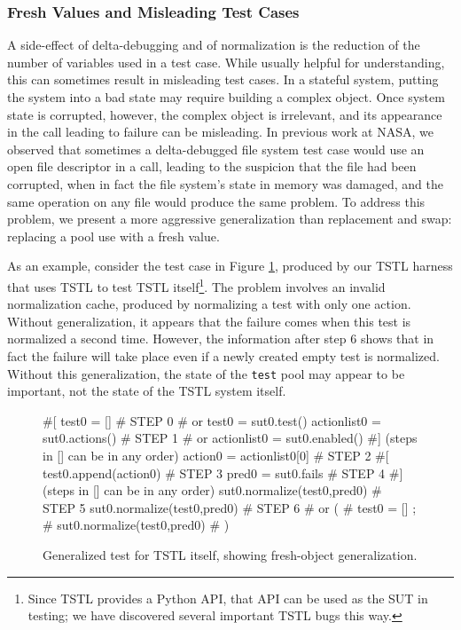 \subsubsection{Fresh Values and Misleading Test Cases}
\label{freshgen}

A side-effect of delta-debugging and of normalization is the reduction
of the number of variables used in a test case.  While usually helpful
for understanding, this can sometimes result in misleading test
cases.  In a stateful system, putting the system into a bad state may require
building a complex object.  Once system state is corrupted, however,
the complex object is irrelevant, and its appearance in the call
leading to failure can be misleading.  In previous work at NASA, we
observed that sometimes a delta-debugged file system test case
\cite{ICSEDiff,AMAI} would use an open file descriptor in a call,
leading to the suspicion that the file had been corrupted, when in
fact the file system's state in memory was damaged, and the same
operation on any file would produce the same problem.  To address this
problem, we present a more aggressive generalization than
replacement and swap:  replacing a pool use with a
fresh value.  

As an example, consider the test case in Figure \ref{fig:mislead},
produced by our TSTL harness that uses TSTL to test TSTL
itself\footnote{Since TSTL provides a Python API, that API can be used
  as the SUT in testing; we have discovered several important TSTL
  bugs this way.}.  The problem involves an invalid normalization
cache, produced by normalizing a test with only one action.  Without
generalization, it appears that the failure comes when this test is
normalized a second time.  However, the information after step 6 shows
that in fact the failure will take place even if a newly created empty test is
normalized.  Without this generalization, the state of the {\tt test} pool
may appear to be important, not the state of the TSTL system itself.

\begin{figure}
{\scriptsize
\begin{code}
\textcolor{black!60}{\#[}
test0 = []                             \textcolor{black!60}{\# STEP 0}
\textcolor{black!60}{\#  or test0 = sut0.test() }
actionlist0 = sut0.actions()           \textcolor{black!60}{\# STEP 1}
\textcolor{black!60}{\#  or actionlist0 = sut0.enabled() }
\textcolor{black!60}{\#] (steps in [] can be in any order)}
action0 = actionlist0[0]               \textcolor{black!60}{\# STEP 2}
\textcolor{black!60}{\#[}
test0.append(action0)                  \textcolor{black!60}{\# STEP 3}
pred0 = sut0.fails                     \textcolor{black!60}{\# STEP 4}
\textcolor{black!60}{\#] (steps in [] can be in any order)}
sut0.normalize(test0,pred0)            \textcolor{black!60}{\# STEP 5}
sut0.normalize(test0,pred0)            \textcolor{black!60}{\# STEP 6}
\textcolor{black!60}{\#  or (}
\textcolor{black!60}{\#      test0 = []  ;}
\textcolor{black!60}{\#      sut0.normalize(test0,pred0) }
\textcolor{black!60}{\#     )}
\end{code}
}
\caption{Generalized test for TSTL itself, showing fresh-object
  generalization.}
\label{fig:mislead}
\end{figure}

